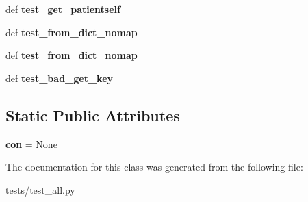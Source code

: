 \begin{DoxyCompactItemize}
\item 
\hypertarget{classtests_1_1test__all_1_1main__test_ad0cabcd246dc3e4ad755ea7abcb86093}{def {\bfseries test\-\_\-get\-\_\-patientself}}\label{classtests_1_1test__all_1_1main__test_ad0cabcd246dc3e4ad755ea7abcb86093}

\item 
\hypertarget{classtests_1_1test__all_1_1main__test_a41e033e5f42465b4a367c169a75ffccc}{def {\bfseries test\-\_\-from\-\_\-dict\-\_\-nomap}}\label{classtests_1_1test__all_1_1main__test_a41e033e5f42465b4a367c169a75ffccc}

\item 
\hypertarget{classtests_1_1test__all_1_1main__test_a41e033e5f42465b4a367c169a75ffccc}{def {\bfseries test\-\_\-from\-\_\-dict\-\_\-nomap}}\label{classtests_1_1test__all_1_1main__test_a41e033e5f42465b4a367c169a75ffccc}

\item 
\hypertarget{classtests_1_1test__all_1_1main__test_ae27a2cb1a6f7e88a9d57a0ea65c0b25d}{def {\bfseries test\-\_\-bad\-\_\-get\-\_\-key}}\label{classtests_1_1test__all_1_1main__test_ae27a2cb1a6f7e88a9d57a0ea65c0b25d}

\end{DoxyCompactItemize}
\subsection*{Static Public Attributes}
\begin{DoxyCompactItemize}
\item 
\hypertarget{classtests_1_1test__all_1_1main__test_ae8735aafa7bd854fb2d057d8e94a643b}{{\bfseries con} = None}\label{classtests_1_1test__all_1_1main__test_ae8735aafa7bd854fb2d057d8e94a643b}

\end{DoxyCompactItemize}


The documentation for this class was generated from the following file\-:\begin{DoxyCompactItemize}
\item 
tests/test\-\_\-all.\-py\end{DoxyCompactItemize}

